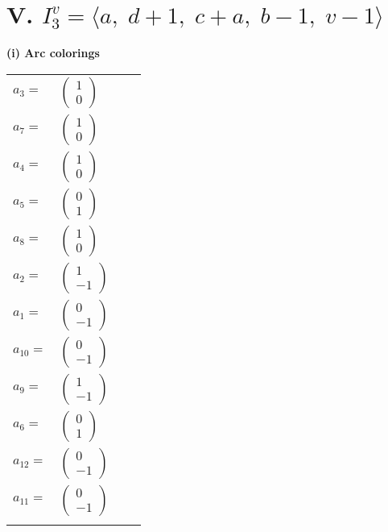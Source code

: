 \documentclass[1p]{elsarticle_modified}
\theoremstyle{definition}
\begin{document}
\centering \section*{V. $I^v_{3}= \langle a,\;d+1,\;c+a,\;b-1,\;v-1 \rangle$}
\flushleft \textbf{(i) Arc colorings}\\
\begin{tabular}{m{7pt} m{180pt} m{7pt} m{180pt} }
\flushright $a_{3}=$&$\begin{pmatrix}1\\0\end{pmatrix}$ \\
\flushright $a_{7}=$&$\begin{pmatrix}1\\0\end{pmatrix}$ \\
\flushright $a_{4}=$&$\begin{pmatrix}1\\0\end{pmatrix}$ \\
\flushright $a_{5}=$&$\begin{pmatrix}0\\1\end{pmatrix}$ \\
\flushright $a_{8}=$&$\begin{pmatrix}1\\0\end{pmatrix}$ \\
\flushright $a_{2}=$&$\begin{pmatrix}1\\-1\end{pmatrix}$ \\
\flushright $a_{1}=$&$\begin{pmatrix}0\\-1\end{pmatrix}$ \\
\flushright $a_{10}=$&$\begin{pmatrix}0\\-1\end{pmatrix}$ \\
\flushright $a_{9}=$&$\begin{pmatrix}1\\-1\end{pmatrix}$ \\
\flushright $a_{6}=$&$\begin{pmatrix}0\\1\end{pmatrix}$ \\
\flushright $a_{12}=$&$\begin{pmatrix}0\\-1\end{pmatrix}$ \\
\flushright $a_{11}=$&$\begin{pmatrix}0\\-1\end{pmatrix}$\\&\end{tabular}
\end{document}
